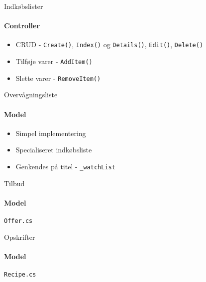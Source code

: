 \begin{frame}{Indkøbslister}
	\framesubtitle{Controller}
	\begin{itemize}
		\item CRUD - \texttt{Create()}, \texttt{Index()} og \texttt{Details()}, \texttt{Edit()}, \texttt{Delete()}
		\vspace{15pt}
		\item Tilføje varer - \texttt{AddItem()}
		\item Slette varer - \texttt{RemoveItem()}
	\end{itemize}
\end{frame}

\begin{frame}{Overvågningsliste}
	\framesubtitle{Model}
	\begin{itemize}
		\item Simpel implementering
		\item Specialiseret indkøbsliste
		\item Genkendes på titel - \texttt{\_watchList}
	\end{itemize}
\end{frame}

\begin{frame}{Tilbud}
	\framesubtitle{Model}
	\texttt{Offer.cs}
		
\end{frame}
\begin{frame}{Opskrifter}
	\framesubtitle{Model}
	\texttt{Recipe.cs}
		
\end{frame}

